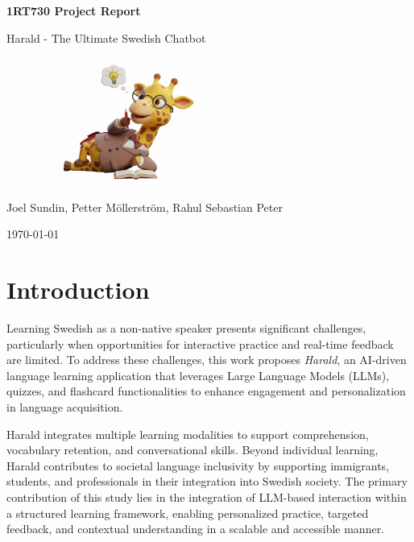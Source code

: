 \documentclass[a4paper,10pt]{article}
\begin{document}
\begin{titlepage}
    \centering
    \vspace*{2cm}
    {\Huge \textbf{1RT730 Project Report} \par}
    \vspace{0.5cm}
    {\LARGE Harald - The Ultimate Swedish Chatbot \par}
    
    \vspace{2cm}
    \includegraphics[width=0.6\textwidth]{cute_thinking_harald.png} %
    \vspace{2cm}
    
    {\Large Joel Sundin, Petter Möllerström, Rahul Sebastian Peter \par}
    \vspace{1cm}
    {\large \today \par}
\end{titlepage}   
\newpage

 \section{Introduction}
Learning Swedish as a non-native speaker presents significant challenges, particularly when opportunities for interactive practice and real-time feedback are limited. To address these challenges, this work proposes \textit{Harald}, an AI-driven language learning application that leverages Large Language Models (LLMs), quizzes, and flashcard functionalities to enhance engagement and personalization in language acquisition.

Harald integrates multiple learning modalities to support comprehension, vocabulary retention, and conversational skills. Beyond individual learning, Harald contributes to societal language inclusivity by supporting immigrants, students, and professionals in their integration into Swedish society. The primary contribution of this study lies in the integration of LLM-based interaction within a structured learning framework, enabling personalized practice, targeted feedback, and contextual understanding in a scalable and accessible manner.
\end{document}
